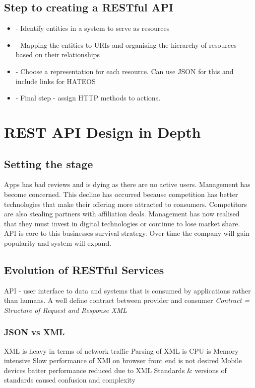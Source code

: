 \documentclass[a4paper, 11pt]{book}
\begin{document}
    \subsection{Step to creating a RESTful API}
    \begin{itemize}
        \item - Identify entities in a system to serve as resources
        \item - Mapping the entities to URIs and organising the hierarchy of resources based on their relationships
        \item - Choose a representation for each resource. Can use JSON for this and include links for HATEOS
        \item - Final step - assign HTTP methods to actions.
    \end{itemize}


    \section{REST API Design in Depth}

    \subsection{Setting the stage}
    Apps has bad reviews and is dying as there are no active users.
    Management has become concerned.
    This decline has occurred because competition has better technologies that make their offering more attracted to consumers.
    Competitors are also stealing partners with affiliation deals.
    Management has now realised that they must invest in digital technologies or continue to lose market share.
    API is core to this businesses survival strategy.
    Over time the company will gain popularity and system will expand.

    \subsection{Evolution of RESTful Services}
    API - user interface to data and systems that is consumed by applications rather than humans.
    A well define contract between provider and consumer
    \textit{Contract = Structure of Request and Response XML}

    \subsubsection{JSON vs XML}
    XML is heavy in terms of network traffic
    Parsing of XML is CPU is Memory intensive
    Slow performance of XMl on browser front end is not desired
    Mobile devices batter performance reduced due to XML
    Standards \& versions of standards caused confusion and complexity
\end{document}
